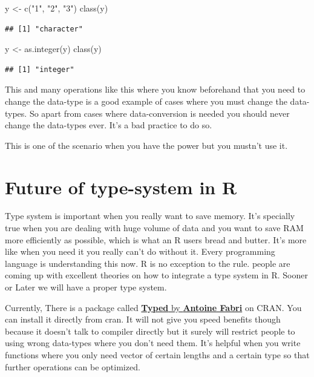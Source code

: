 \documentclass[
]{book}
\newenvironment{Shaded}{\begin{snugshade}}{\end{snugshade}}
\newcommand{\FunctionTok}[1]{\textcolor[rgb]{0.00,0.00,0.00}{#1}}
\newcommand{\NormalTok}[1]{#1}
\newcommand{\OtherTok}[1]{\textcolor[rgb]{0.56,0.35,0.01}{#1}}
\newcommand{\StringTok}[1]{\textcolor[rgb]{0.31,0.60,0.02}{#1}}
\begin{document}
\begin{Shaded}
\begin{Highlighting}[]
\NormalTok{y }\OtherTok{\textless{}{-}} \FunctionTok{c}\NormalTok{(}\StringTok{"1"}\NormalTok{, }\StringTok{"2"}\NormalTok{, }\StringTok{"3"}\NormalTok{)}
\FunctionTok{class}\NormalTok{(y)}
\end{Highlighting}
\end{Shaded}

\begin{verbatim}
## [1] "character"
\end{verbatim}

\begin{Shaded}
\begin{Highlighting}[]
\NormalTok{y }\OtherTok{\textless{}{-}} \FunctionTok{as.integer}\NormalTok{(y)}
\FunctionTok{class}\NormalTok{(y)}
\end{Highlighting}
\end{Shaded}

\begin{verbatim}
## [1] "integer"
\end{verbatim}

This and many operations like this where you know beforehand that you need to change the data-type is a good example of cases where you must change the data-types. So apart from cases where data-conversion is needed you should never change the data-types ever. It's a bad practice to do so.

This is one of the scenario when you have the power but you mustn't use it.

\hypertarget{future-of-type-system-in-r}{%
\section{Future of type-system in R}\label{future-of-type-system-in-r}}

Type system is important when you really want to save memory. It's specially true when you are dealing with huge volume of data and you want to save RAM more efficiently as possible, which is what an R users bread and butter. It's more like when you need it you really can't do without it. Every programming language is understanding this now. R is no exception to the rule. people are coming up with excellent theories on how to integrate a type system in R. Sooner or Later we will have a proper type system.

Currently, There is a package called \href{https://github.com/moodymudskipper/typed}{\textbf{Typed} by \textbf{Antoine Fabri}} on CRAN. You can install it directly from cran. It will not give you speed benefits though because it doesn't talk to compiler directly but it surely will restrict people to using wrong data-types where you don't need them. It's helpful when you write functions where you only need vector of certain lengths and a certain type so that further operations can be optimized.
\end{document}
